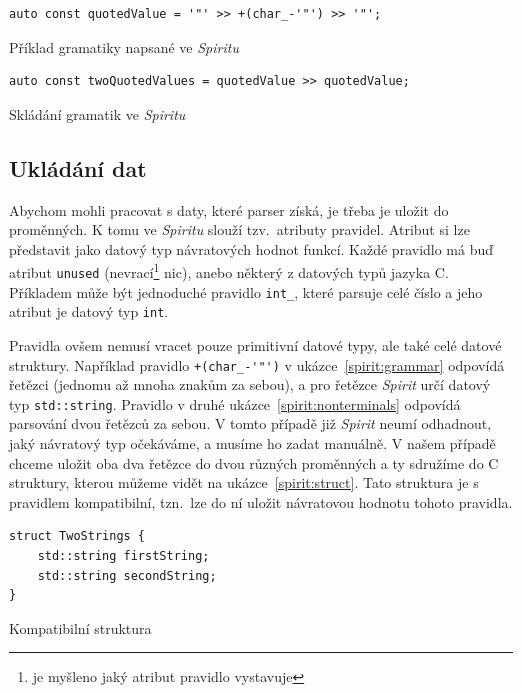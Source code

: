 \documentclass[thesis=B,czech,hidelinks]{FITthesis}[2019/03/06]
\newcommand{\Rplus}{\protect\hspace{-.1em}\protect\raisebox{.35ex}{\smaller{\smaller\textbf{+}}}}
\newcommand{\Cpp}{\mbox{C\Rplus\Rplus}\xspace}
\begin{document}
\begin{listing}
\begin{verbatim}
auto const quotedValue = '"' >> +(char_-'"') >> '"';
\end{verbatim}
\caption{Příklad gramatiky napsané ve \textit{Spiritu}}\label{spirit:grammar}
\end{listing}

\begin{listing}
\begin{verbatim}
auto const twoQuotedValues = quotedValue >> quotedValue;
\end{verbatim}
\caption{Skládání gramatik ve \textit{Spiritu}}\label{spirit:nonterminals}
\end{listing}


\subsection{Ukládání dat}
Abychom mohli pracovat s daty, které parser získá, je třeba je uložit do proměnných. K tomu ve \textit{Spiritu} slouží tzv.\ atributy pravidel. Atribut si lze představit jako datový typ návratových hodnot funkcí. Každé pravidlo má buď atribut \texttt{unused} (nevrací\footnote{ je myšleno jaký atribut pravidlo vystavuje} nic), anebo některý z datových typů jazyka \Cpp{}. Příkladem může být jednoduché pravidlo \verb¨int_¨, které parsuje celé číslo a jeho atribut je datový typ \texttt{int}.

Pravidla ovšem nemusí vracet pouze primitivní datové typy, ale také celé datové struktury. Například pravidlo \verb¨+(char_-'"')¨ v ukázce~\ref{spirit:grammar} odpovídá řetězci (jednomu až mnoha znakům za sebou), a pro řetězce \textit{Spirit} určí datový typ \texttt{std::string}. Pravidlo v druhé ukázce~\ref{spirit:nonterminals} odpovídá parsování dvou řetězců za sebou. V tomto případě již \textit{Spirit} neumí odhadnout, jaký návratový typ očekáváme, a musíme ho zadat manuálně. V našem případě chceme uložit oba dva řetězce do dvou různých proměnných a ty sdružíme do \Cpp{} struktury, kterou můžeme vidět na ukázce~\ref{spirit:struct}. Tato struktura je s pravidlem kompatibilní, tzn.\ lze do ní uložit návratovou hodnotu tohoto pravidla.

\begin{listing}
\begin{verbatim}
struct TwoStrings {
    std::string firstString;
    std::string secondString;
}
\end{verbatim}
\caption{Kompatibilní struktura}\label{spirit:struct}
\end{listing}
\end{document}

